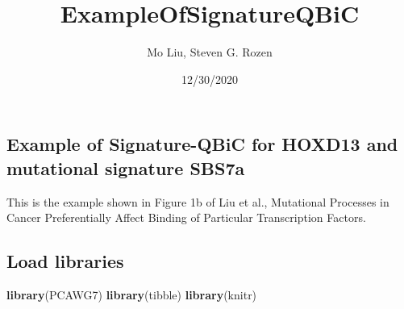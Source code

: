 \documentclass[
]{article}
\title{ExampleOfSignatureQBiC}
\author{Mo Liu, Steven G. Rozen}
\date{12/30/2020}
\newenvironment{Shaded}{\begin{snugshade}}{\end{snugshade}}
\newcommand{\KeywordTok}[1]{\textcolor[rgb]{0.13,0.29,0.53}{\textbf{#1}}}
\newcommand{\NormalTok}[1]{#1}
\begin{document}
\maketitle

\hypertarget{example-of-signature-qbic-for-hoxd13-and-mutational-signature-sbs7a}{%
\subsection{Example of Signature-QBiC for HOXD13 and mutational
signature
SBS7a}\label{example-of-signature-qbic-for-hoxd13-and-mutational-signature-sbs7a}}

This is the example shown in Figure 1b of Liu et al., Mutational
Processes in Cancer Preferentially Affect Binding of Particular
Transcription Factors.

\hypertarget{load-libraries}{%
\subsection{Load libraries}\label{load-libraries}}

\begin{Shaded}
\begin{Highlighting}[]
\KeywordTok{library}\NormalTok{(PCAWG7)}
\KeywordTok{library}\NormalTok{(tibble)}
\KeywordTok{library}\NormalTok{(knitr)}
\end{Highlighting}
\end{Shaded}
\end{document}
